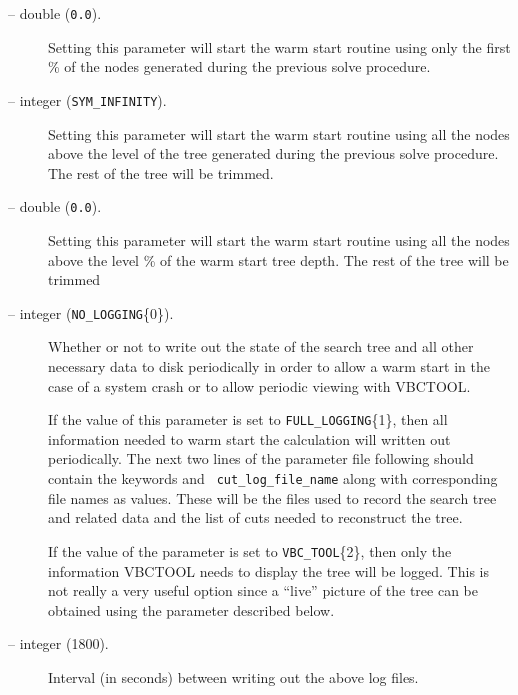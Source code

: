 \begin{description}
\item[ -- double ({\tt 0.0}).]
Setting this parameter will start the warm start routine using only the 
first \% of the nodes generated during the 
previous solve procedure. 

\item[ -- integer ({\tt SYM\_INFINITY}).]
Setting this parameter will start the warm start routine using all the
nodes above the level  of the 
tree generated during the previous solve procedure. The rest of the tree 
will be trimmed. 

\item[ -- double ({\tt 0.0}).]
Setting this parameter will start the warm start routine using all the
nodes above the level \% of the 
warm start tree depth. The rest of the tree will be trimmed

\item[ -- integer ({\tt NO\_LOGGING}\{0\}).] 
Whether or not to write out the state of the search tree and all other
necessary data to disk periodically in order to allow a warm start in
the case of a system crash or to allow periodic viewing with VBCTOOL.

If the value of this parameter is set to {\tt FULL\_LOGGING}\{1\},
then all information needed to warm start the calculation will written
out periodically. The next two lines of the parameter file following
should contain the keywords  and {\tt
cut\_log\_file\_name} along with corresponding file names as values.
These will be the files used to record the search tree and related
data and the list of cuts needed to reconstruct the tree.

If the value of the parameter is set to {\tt VBC\_TOOL}\{2\}, then
only the information VBCTOOL needs to display the tree will be
logged. This is not really a very useful option since a ``live'' picture
of the tree can be obtained using the  parameter
described below.

\item[ -- integer (1800).] 
Interval (in seconds) between writing out the above log files.


\end{description}
